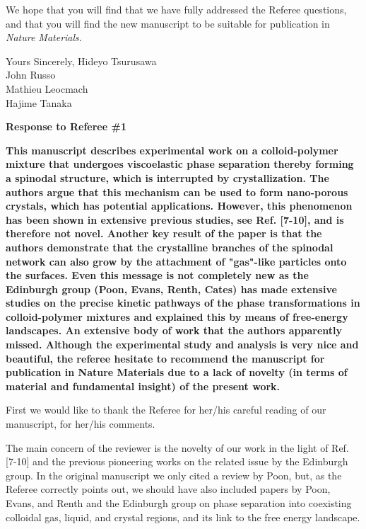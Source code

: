 \documentclass[11pt]{article}
\begin{document}
We hope that you will find that we have fully addressed the Referee questions, and
that you will find the new manuscript to be suitable for publication in \emph{Nature Materials}.




\vskip 0.8cm

\noindent
Yours Sincerely,
\vskip 0.3cm
\indent Hideyo Tsurusawa\\
\indent John Russo\\
\indent Mathieu Leocmach\\
\indent Hajime Tanaka

\clearpage

\noindent
\begin{Large}
{\bf Response to Referee \#1}
\end{Large}

\vspace{1em}

\singlespacing

{\bf
This manuscript describes experimental work on a colloid-polymer mixture that undergoes viscoelastic phase separation thereby forming a spinodal structure, which is interrupted by crystallization. The authors argue that this mechanism can be used to form nano-porous crystals, which has potential applications. However, this phenomenon has been shown in extensive previous studies, see Ref. [7-10], and is therefore not novel. Another key result of the paper is that the authors demonstrate that the crystalline branches of the spinodal network can also grow by the attachment of "gas"-like particles onto the surfaces. Even this message is not completely new as the Edinburgh group (Poon, Evans, Renth, Cates) has made extensive studies on the precise kinetic pathways of the phase transformations in colloid-polymer mixtures and explained this by means of free-energy landscapes. An extensive body of work that the authors apparently missed. Although the experimental study and analysis is very nice and beautiful, the 
referee hesitate to recommend the manuscript for publication in Nature Materials due to a lack of novelty (in terms of material and fundamental insight) of the present work.
}


\bigskip
\doublespacing

First we would like to thank the Referee for her/his careful reading of our manuscript, for her/his comments. 

The main concern of the reviewer is the novelty of our work in the light of Ref. [7-10] and the previous pioneering works on the related issue by the Edinburgh group. In the original manuscript we only cited a review by Poon, but, as the Referee correctly points out, we should have
also included papers by Poon, Evans, and Renth and the Edinburgh group on phase separation into coexisting colloidal gas, liquid, and crystal regions, and its link to the free energy landscape.
\end{document}
